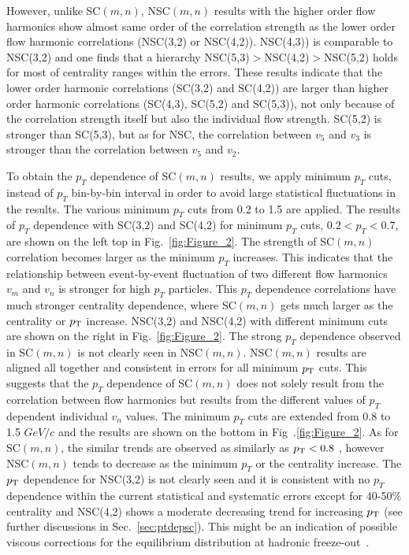 \documentclass[ALICE,manyauthors]{cernphprep}
\begin{document}
However, unlike SC$(m,n)$, NSC$(m,n)$ results with the higher order flow harmonics show almost same order of the correlation strength as the lower order flow harmonic correlations (NSC(3,2) or NSC(4,2)). NSC(4,3)) is comparable to NSC(3,2) and one finds that a hierarchy NSC(5,3)$>$NSC(4,2)$>$NSC(5,2) holds for most of centrality ranges within the errors.
These results indicate that the lower order harmonic correlations (SC(3,2) and SC(4,2)) are larger than higher order harmonic correlations (SC(4,3), SC(5,2) and SC(5,3)), not only because of the correlation strength itself but also the individual flow strength. 
SC(5,2) is stronger than SC(5,3), but as for NSC, the correlation between $v_5$ and $v_3$ is stronger than the correlation between $v_5$ and $v_2$. 

To obtain the $p_T$ dependence of SC$(m,n)$ results, we apply minimum $p_T$ cuts, instead of $p_T$ bin-by-bin interval in order to avoid large statistical fluctuations in the results. The various minimum $p_T$ cuts from 0.2 to 1.5 are applied.
The results of $p_T$ dependence with SC(3,2) and SC(4,2) for minimum $p_T$ cuts, $0.2<p_T<0.7$, are shown on the left top in Fig.~\ref{fig:Figure_2}.
The strength of SC$(m,n)$ correlation becomes larger as the minimum $p_T$ increases. This indicates that the relationship between event-by-event fluctuation of two different flow harmonics $v_m$ and $v_n$ is stronger for high $p_T$ particles. 
This $p_T$ dependence correlations have much stronger centrality dependence, where SC$(m,n)$ gets much larger as the centrality or $p_{\textnormal{T}}{}$ increase. 
NSC(3,2) and NSC(4,2) with different minimum cuts are shown on the right in Fig.~\ref{fig:Figure_2}.
The strong $p_T$ dependence observed in SC$(m,n)$ is not clearly seen in NSC$(m,n)$. NSC$(m,n)$ results are aligned all together and consistent in errors for all minimum $p_{\textnormal{T}}{}$ cuts. 
This suggests that the $p_T$ dependence of SC$(m,n)$ does not solely result from the correlation between flow harmonics but results from the different values of $p_T$  dependent individual $v_n$ values. 
The minimum $p_T$ cuts are extended from 0.8  to 1.5 $GeV/c$ and the results are shown on the bottom in Fig~.\ref{fig:Figure_2}.
As for SC$(m,n)$, the similar trends are observed as similarly as $p_{\textnormal{T}}{}<0.8$ , however NSC$(m,n)$ tends to decrease as the minimum $p_T$ or the centrality increase.
The $p_{\textnormal{T}}{}$ dependence for NSC(3,2) is not clearly seen and it is consistent with no $p_T$ dependence within the current statistical and systematic errors except for 40-50\% centrality
and NSC(4,2) shows a moderate decreasing trend for increasing $p_{\textnormal{T}}{}$ (see further discussions in Sec.~\ref{sec:ptdepsc}).
This might be an indication of possible viscous corrections for the equilibrium distribution at hadronic freeze-out~\cite{Luzum:2010ad}.
\end{document}
